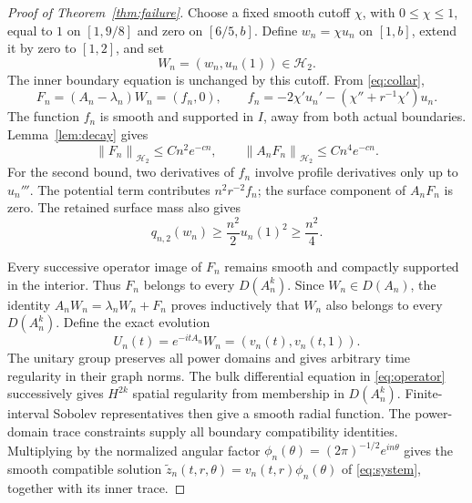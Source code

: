 \documentclass[11pt]{article}
\newcommand{\HH}{\mathcal H}
\newcommand{\norm}[1]{\left\|#1\right\|}
\begin{document}
\begin{proof}[Proof of Theorem~\ref{thm:failure}]
Choose a fixed smooth cutoff \(\chi\), with \(0\le\chi\le1\), equal to
\(1\) on \([1,9/8]\) and zero on \([6/5,b]\). Define \(w_n=\chi u_n\)
on \([1,b]\), extend it by zero to \([1,2]\), and set
\[
W_n=(w_n,u_n(1))\in\HH_2.
\]
The inner boundary equation is unchanged by this cutoff. From
\eqref{eq:collar},
\begin{equation}\label{eq:residual}
F_n=(A_n-\lambda_n)W_n=(f_n,0),\qquad
f_n=-2\chi'u_n'-(\chi''+r^{-1}\chi')u_n.
\end{equation}
The function \(f_n\) is smooth and supported in \(I\), away from both
actual boundaries. Lemma~\ref{lem:decay} gives
\begin{equation}\label{eq:residualbounds}
\norm{F_n}_{\HH_2}\le Cn^2e^{-cn},\qquad
\norm{A_nF_n}_{\HH_2}\le Cn^4e^{-cn}.
\end{equation}
For the second bound, two derivatives of \(f_n\) involve profile derivatives
only up to \(u_n'''\). The potential term contributes \(n^2r^{-2}f_n\);
the surface component of \(A_nF_n\) is zero.
The retained surface mass also gives
\begin{equation}\label{eq:initiallower}
q_{n,2}(w_n)\ge\frac{n^2}{2}u_n(1)^2\ge\frac{n^2}{4}.
\end{equation}

Every successive operator image of \(F_n\) remains smooth and compactly
supported in the interior. Thus \(F_n\) belongs to every \(D(A_n^k)\).
Since \(W_n\in D(A_n)\), the identity
\(A_nW_n=\lambda_nW_n+F_n\) proves inductively that \(W_n\) also belongs
to every \(D(A_n^k)\).
Define the exact evolution
\[
U_n(t)=e^{-itA_n}W_n=(v_n(t),v_n(t,1)).
\]
The unitary group preserves all power domains and gives arbitrary time
regularity in their graph norms. The bulk differential equation in
\eqref{eq:operator} successively gives \(H^{2k}\) spatial regularity from
membership in \(D(A_n^k)\). Finite-interval Sobolev representatives then
give a smooth radial function. The power-domain trace constraints supply
all boundary compatibility identities. Multiplying by the normalized angular factor
\(\phi_n(\theta)=(2\pi)^{-1/2}e^{in\theta}\) gives the smooth compatible
solution \(\widetilde z_n(t,r,\theta)=v_n(t,r)\phi_n(\theta)\) of
\eqref{eq:system}, together with its inner trace.


\end{proof}
\end{document}
